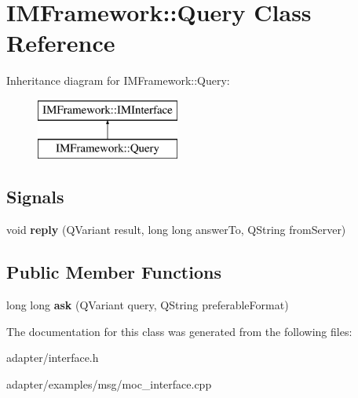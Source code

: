 \hypertarget{classIMFramework_1_1Query}{
\section{IMFramework::Query Class Reference}
\label{classIMFramework_1_1Query}
}
Inheritance diagram for IMFramework::Query:\begin{figure}[H]
\begin{center}
\leavevmode
\includegraphics[height=2cm]{classIMFramework_1_1Query}
\end{center}
\end{figure}
\subsection*{Signals}
\begin{DoxyCompactItemize}
\item 
\hypertarget{classIMFramework_1_1Query_ae3523e46600c76138027d3cf4e663a4d}{
void {\bfseries reply} (QVariant result, long long answerTo, QString fromServer)}
\label{classIMFramework_1_1Query_ae3523e46600c76138027d3cf4e663a4d}

\end{DoxyCompactItemize}
\subsection*{Public Member Functions}
\begin{DoxyCompactItemize}
\item 
\hypertarget{classIMFramework_1_1Query_aa35bfaeeb38a1b64aaeff6d8f07e45eb}{
long long {\bfseries ask} (QVariant query, QString preferableFormat)}
\label{classIMFramework_1_1Query_aa35bfaeeb38a1b64aaeff6d8f07e45eb}

\end{DoxyCompactItemize}


The documentation for this class was generated from the following files:\begin{DoxyCompactItemize}
\item 
adapter/interface.h\item 
adapter/examples/msg/moc\_\-interface.cpp\end{DoxyCompactItemize}
